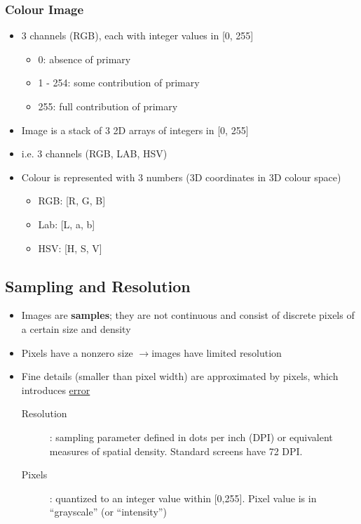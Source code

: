 \documentclass[letterpaper,12pt]{article}
\newcommand{\lra}{\ensuremath{\longrightarrow{}}}
\begin{document}
\subsubsection{Colour Image}
\begin{itemize}
 \item 3 channels (RGB), each with integer values in [0, 255]
       \begin{itemize}
        \item 0: absence of primary
        \item 1 - 254: some contribution of primary
        \item 255: full contribution of primary
       \end{itemize}
 \item Image is a stack of 3 2D arrays of integers in [0, 255]
 \item i.e. 3 channels (RGB, LAB, HSV)
 \item Colour is represented with 3 numbers (3D coordinates in 3D colour space)
       \begin{itemize}
        \item RGB: [R, G, B]
        \item Lab: [L, a, b]
        \item HSV: [H, S, V]
       \end{itemize}
\end{itemize}

\subsection{Sampling and Resolution}
\begin{itemize}
 \item Images are \textbf{samples}; they are not continuous and consist of discrete pixels of a certain size and density
 \item Pixels have a nonzero size \lra images have limited resolution
 \item Fine details (smaller than pixel width) are approximated by pixels, which introduces \underline{error}
       \begin{description}
        \item[Resolution]: sampling parameter defined in dots per inch (DPI) or equivalent measures of spatial density. Standard screens have 72 DPI.
        \item[Pixels]: quantized to an integer value within [0,255]. Pixel value is in ``grayscale'' (or ``intensity'')
       \end{description}
\end{itemize}
\end{document}
